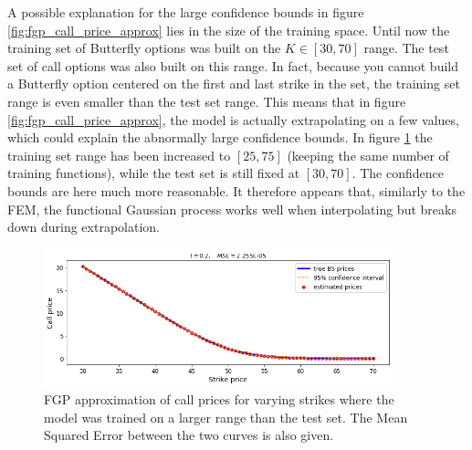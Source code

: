 \documentclass[a4paper,12pt]{article}
\begin{document}
\noindent A possible explanation for the large confidence bounds in figure \ref{fig:fgp_call_price_approx} lies in the size of the training space. Until now the training set of Butterfly options was built on the $K \in [30, 70]$ range. The test set of call options was also built on this range. In fact, because you cannot build a Butterfly option centered on the first and last strike in the set, the training set range is even smaller than the test set range. This means that in figure \ref{fig:fgp_call_price_approx}, the model is actually extrapolating on a few values, which could explain the abnormally large confidence bounds. In figure \ref{fig:fgp_call_price_approx_linspace} the training set range has been increased to $[25, 75]$ (keeping the same number of training functions), while the test set is still fixed at $[30, 70]$. The confidence bounds are here much more reasonable. It therefore appears that, similarly to the FEM, the functional Gaussian process works well when interpolating but breaks down during extrapolation.
\begin{figure} [H]
    \centering
    \includegraphics[width=0.9\textwidth]{fgp_call_price_approx_linspace_.png}
    \caption{FGP approximation of call prices for varying strikes where the model was trained on a larger range than the test set. The Mean Squared Error between the two curves is also given.}
    \label{fig:fgp_call_price_approx_linspace}
\end{figure}
\end{document}
